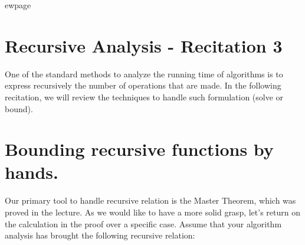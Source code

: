 ewpage
\section{Recursive Analysis - Recitation 3} 
\author{Master theorem and recursive trees.}

 
\begin{paragraph}
    One of the standard methods to analyze the running time of algorithms is to express recursively the number of operations that are made. In the following recitation, we will review the techniques to handle such formulation (solve or bound).  
\end{paragraph}


\section{Bounding recursive functions by hands.} Our primary tool to handle recursive relation is the Master Theorem, which was proved in the lecture. As we would like to have a more solid grasp, let's return on the calculation in the proof over a specific case. 
Assume that your algorithm analysis has brought the following recursive relation:
